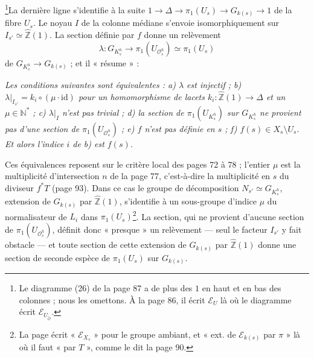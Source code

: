 \documentclass[11pt,a4paper]{article}
\begin{document}
\footnote{Le diagramme (26) de la page 87 a de plus des $1$ en haut et en bas
des colonnes ; nous les omettons. À la page 86, il écrit $\mathcal{E}_U$ là où
le diagramme écrit $\mathcal{E}_{U_{\tilde{\mathcal{O}}}}$.}La dernière ligne
s'identifie à la suite $1 \to \Delta \to \pi_1(U_s) \to G_{k(s)} \to 1$ de la
fibre $U_s$. Le noyau $I$ de la colonne médiane s'envoie isomorphiquement sur
$I_{s'} \simeq \widehat{\mathbb{Z}}(1)$. La section définie par $f$ donne un
relèvement
\[
\lambda : G_{K^h_s} \longrightarrow \pi_1(U_{\mathcal{O}^h_s}) \simeq
\pi_1(U_s)
\]
de $G_{K^h_s} \to G_{k(s)}$ ; et il « résume » :

\emph{Les conditions suivantes sont équivalentes : a) $\lambda$ est injectif ;
b) $\lambda|_{I_{s'}} = k_i \circ (\mu \cdot \mathrm{id})$ pour un
homomorphisme de lacets $k_i : \widehat{\mathbb{Z}}(1) \to \Delta$ et un
$\mu \in \mathbb{N}^{*}$ ; c) $\lambda|_{I}$ n'est pas trivial ; d) la section
de $\pi_1(U_{K^h_s})$ sur $G_{K^h_s}$ ne provient pas d'une section de
$\pi_1(U_{\mathcal{O}^h_s})$ ; e) $f$ n'est pas définie en $s$ ; f) $f(s) \in
X_s \setminus U_s$. Et alors l'indice $i$ de b) est $f(s)$.}

Ces équivalences reposent sur le critère local des pages 72 à 78 ; l'entier
$\mu$ est la multiplicité d'intersection $n$ de la page 77, c'est-à-dire la
multiplicité en $s$ du diviseur $f^{*}T$ (page 93). Dans ce cas le groupe de
décomposition $N_{s'} \simeq G_{K^h_s}$, extension de $G_{k(s)}$ par
$\widehat{\mathbb{Z}}(1)$, s'identifie à un sous-groupe d'indice $\mu$ du
normalisateur de $L_i$ dans $\pi_1(U_s)$\footnote{La page écrit
« $\mathcal{E}_{X_s}$ » pour le groupe ambiant, et « ext. de $\mathcal{E}_{k(s)}$
par $\pi$ » là où il faut « par $T$ », comme le dit la page 90.}. La section,
qui ne provient d'aucune section de $\pi_1(U_{\mathcal{O}^h_s})$, définit donc
« presque » un relèvement — seul le facteur $I_{s'}$ y fait obstacle — et toute
section de cette extension de $G_{k(s)}$ par $\widehat{\mathbb{Z}}(1)$ donne une
section de seconde espèce de $\pi_1(U_s)$ sur $G_{k(s)}$.
\end{document}
